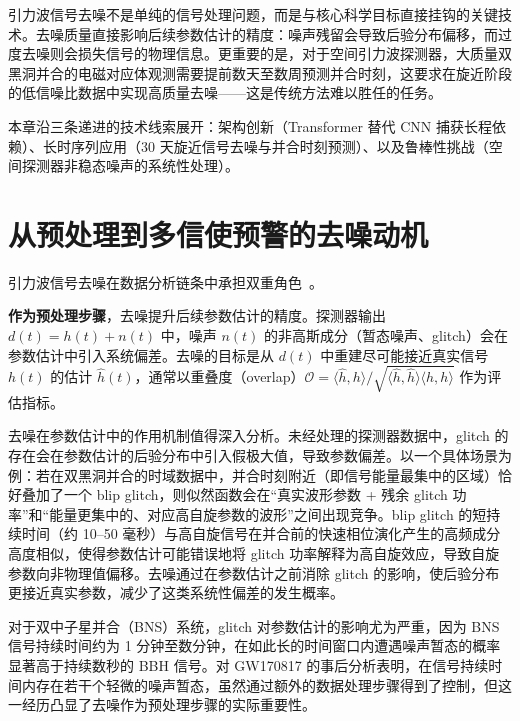 

引力波信号去噪不是单纯的信号处理问题，而是与核心科学目标直接挂钩的关键技术。去噪质量直接影响后续参数估计的精度：噪声残留会导致后验分布偏移，而过度去噪则会损失信号的物理信息。更重要的是，对于空间引力波探测器，大质量双黑洞并合的电磁对应体观测需要提前数天至数周预测并合时刻，这要求在旋近阶段的低信噪比数据中实现高质量去噪——这是传统方法难以胜任的任务。

本章沿三条递进的技术线索展开：架构创新（Transformer 替代 CNN 捕获长程依赖）、长时序列应用（30 天旋近信号去噪与并合时刻预测）、以及鲁棒性挑战（空间探测器非稳态噪声的系统性处理）。

\section{从预处理到多信使预警的去噪动机}

引力波信号去噪在数据分析链条中承担双重角色~\cite{Torres2016glitch,Coughlin2019subtraction}。

\textbf{作为预处理步骤}，去噪提升后续参数估计的精度。探测器输出 $d(t) = h(t) + n(t)$ 中，噪声 $n(t)$ 的非高斯成分（暂态噪声、glitch）会在参数估计中引入系统偏差。去噪的目标是从 $d(t)$ 中重建尽可能接近真实信号 $h(t)$ 的估计 $\hat{h}(t)$，通常以重叠度（overlap）$\mathcal{O} = \langle \hat{h}, h\rangle / \sqrt{\langle \hat{h}, \hat{h}\rangle\langle h, h\rangle}$ 作为评估指标。

去噪在参数估计中的作用机制值得深入分析。未经处理的探测器数据中，glitch 的存在会在参数估计的后验分布中引入假极大值，导致参数偏差。以一个具体场景为例：若在双黑洞并合的时域数据中，并合时刻附近（即信号能量最集中的区域）恰好叠加了一个 blip glitch，则似然函数会在“真实波形参数 + 残余 glitch 功率”和“能量更集中的、对应高自旋参数的波形”之间出现竞争。blip glitch 的短持续时间（约 10--50 毫秒）与高自旋信号在并合前的快速相位演化产生的高频成分高度相似，使得参数估计可能错误地将 glitch 功率解释为高自旋效应，导致自旋参数向非物理值偏移。去噪通过在参数估计之前消除 glitch 的影响，使后验分布更接近真实参数，减少了这类系统性偏差的发生概率。

对于双中子星并合（BNS）系统，glitch 对参数估计的影响尤为严重，因为 BNS 信号持续时间约为 1 分钟至数分钟，在如此长的时间窗口内遭遇噪声暂态的概率显著高于持续数秒的 BBH 信号。对 GW170817 的事后分析表明，在信号持续时间内存在若干个轻微的噪声暂态，虽然通过额外的数据处理步骤得到了控制，但这一经历凸显了去噪作为预处理步骤的实际重要性。

